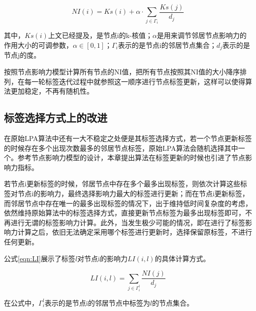 \begin{equation}
  \label{eqn:NI}
  NI(i)=Ks(i)+\alpha \cdot \sum_{j \in \Gamma _i} \frac{Ks(j)}{d_j}
\end{equation}

其中，$Ks(i)$上文已经提及，是节点i的k-核值；$\alpha$是用来调节邻居节点影响力的作用大小的可调参数，$\alpha \in [0,1]$；$\Gamma _i$表示的是节点i的邻居节点集合；$d_j$表示的是节点j的度。

按照节点影响力模型计算所有节点的NI值，把所有节点按照其NI值的大小降序排列，在每一轮标签迭代过程中就参照这一顺序进行节点标签更新，这样可以使得算法更加稳定，不再有随机性。

\subsection{标签选择方式上的改进}

在原始LPA算法中还有一大不稳定之处便是其标签选择方式，若一个节点更新标签的时候存在多个出现次数最多的邻居节点标签，原始LPA算法会随机选择其中一个。参考节点影响力模型的设计，本章提出算法在标签更新的时候也引进了节点影响力指标。

若节点i更新标签的时候，邻居节点中存在多个最多出现标签，则依次计算这些标签对节点i的影响力，最终选择影响力最大的标签进行更新；而在节点i更新标签，而邻居节点中存在唯一的最多出现标签的情况下，出于维持低时间复杂度的考虑，依然维持原始算法中的标签选择方式，直接更新节点标签为最多出现标签即可，不再进行无谓的标签影响力计算。此外，当发生极少可能的情况，即在进行了标签影响力计算之后，依旧无法确定采用哪个标签进行更新时，选择保留原标签，不进行任何更新。

公式\ref{eqn:LI}展示了标签$l$对节点i的影响力$LI(i,l)$的具体计算方式。

\begin{equation}
  \label{eqn:LI}
  LI(i,l)=\sum_{j \in \Gamma _i ^l} \frac{NI(j)}{d_j}
\end{equation}

在公式中，$\Gamma _i ^l$表示的是节点i的邻居节点中标签为$l$的节点集合。



